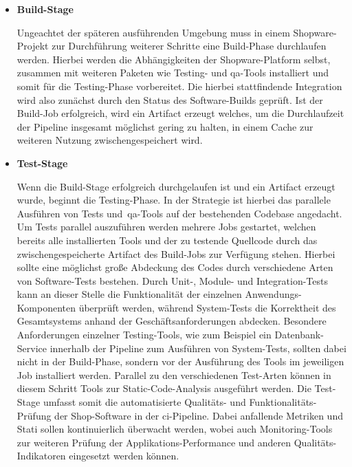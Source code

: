 \begin{itemize}
    \item {
        \textbf{Build-Stage}\par
        Ungeachtet der späteren ausführenden Umgebung muss in einem Shopware-Projekt zur Durchführung weiterer Schritte
        eine Build-Phase durchlaufen werden.
        Hierbei werden die Abhängigkeiten der Shopware-Platform selbst, zusammen mit weiteren Paketen wie Testing- und
        \acrshort{qa}-Tools installiert und somit für die Testing-Phase vorbereitet.
        Die hierbei stattfindende Integration wird also zunächst durch den Status des Software-Builds geprüft.
        Ist der Build-Job erfolgreich, wird ein Artifact erzeugt welches, um die Durchlaufzeit der Pipeline insgesamt
        möglichst gering zu halten, in einem Cache zur weiteren Nutzung zwischengespeichert wird.
    }

    \item {
        \textbf{Test-Stage}\par
        Wenn die Build-Stage erfolgreich durchgelaufen ist und ein Artifact erzeugt wurde, beginnt die Testing-Phase.
        In der Strategie ist hierbei das parallele Ausführen von Tests und\ \acrshort{qa}-Tools auf der bestehenden
        Codebase angedacht.
        Um Tests parallel auszuführen werden mehrere Jobs gestartet, welchen bereits alle installierten Tools
        und der zu testende Quellcode durch das zwischengespeicherte Artifact des Build-Jobs zur Verfügung stehen.
        Hierbei sollte eine möglichst große Abdeckung des Codes durch verschiedene Arten von Software-Tests bestehen.
        Durch Unit-, Module- und Integration-Tests kann an dieser Stelle die Funktionalität der einzelnen
        Anwendungs-Komponenten überprüft werden, während System-Tests die Korrektheit des Gesamtsystems anhand der
        Geschäftsanforderungen abdecken.
        Besondere Anforderungen einzelner Testing-Tools, wie zum Beispiel ein Datenbank-Service innerhalb der Pipeline
        zum Ausführen von System-Tests, sollten dabei nicht in der Build-Phase, sondern vor der Ausführung des Tools im
        jeweiligen Job installiert werden.
        Parallel zu den verschiedenen Test-Arten können in diesem Schritt Tools zur Static-Code-Analysis ausgeführt
        werden.
        Die Test-Stage umfasst somit die automatisierte Qualitäts- und Funktionalitäts-Prüfung der Shop-Software in der
        \acrshort{ci}-Pipeline.
        Dabei anfallende Metriken und Stati sollen kontinuierlich überwacht werden, wobei auch Monitoring-Tools zur
        weiteren Prüfung der Applikations-Performance und anderen Qualitäts-Indikatoren eingesetzt werden können.
    }


\end{itemize}
